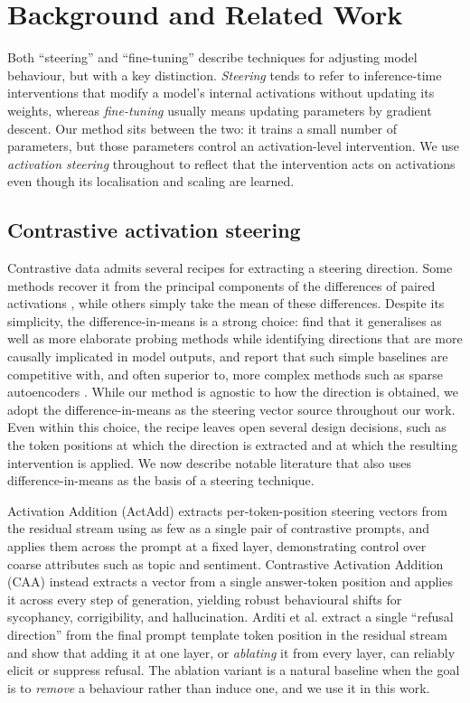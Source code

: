 \documentclass[logo,msc,notimes]{infthesis}
\begin{document}
\chapter{Background and Related Work}\label{ch:related}

Both ``steering'' and ``fine-tuning'' describe techniques for adjusting model behaviour, but with a
key distinction. \emph{Steering} tends to refer to inference-time interventions that modify a model's
internal activations without updating its weights, whereas \emph{fine-tuning} usually means updating parameters by gradient
descent. Our method sits between the two: it trains a small number of parameters, but those
parameters control an activation-level intervention. We use \emph{activation steering} throughout to
reflect that the intervention acts on activations even though its localisation and scaling are
learned.

\section{Contrastive activation steering}\label{sec:contrastive-steering}

Contrastive data admits several recipes for extracting a steering direction. Some methods recover it
from the principal components of the differences of paired activations \citep{zou2023repe}, while others 
simply take the mean of these differences. Despite its simplicity, the difference-in-means
is a strong choice: \citet{marks2024geometry} find that it generalises as well as more elaborate
probing methods while identifying directions that are more causally implicated in model outputs, and
\citet{wu2025axbench} report that such simple baselines are competitive with, and often superior to,
 more complex methods such as sparse autoencoders \citep{templeton2024scaling}. While our
method is agnostic to how the direction is obtained, we adopt the difference-in-means as the steering vector source throughout our work. Even within this choice, the recipe leaves open
several design decisions, such as the token positions at which the direction is extracted and
at which the resulting intervention is applied.
We now describe notable literature that also uses difference-in-means as the basis of a steering technique. 

Activation Addition (ActAdd) \citep{turner2025actadd} extracts per-token-position steering vectors
from the residual stream using as few as a single pair of contrastive prompts, and applies them
across the prompt at a fixed layer, demonstrating control over coarse attributes such as topic and
sentiment. Contrastive Activation Addition (CAA) \citep{rimsky2024caa} instead extracts a vector
from a single answer-token position and applies it across every step of generation, yielding robust
behavioural shifts for sycophancy, corrigibility, and hallucination. Arditi et al.
\citep{arditi2024refusal} extract a single ``refusal direction'' from the final prompt template token position in the residual stream and show
that adding it at one layer, or \emph{ablating} it from every layer, can reliably elicit or suppress
refusal. The ablation variant is a natural baseline when the goal is to \emph{remove} a behaviour
rather than induce one, and we use it in this work.
\end{document}
